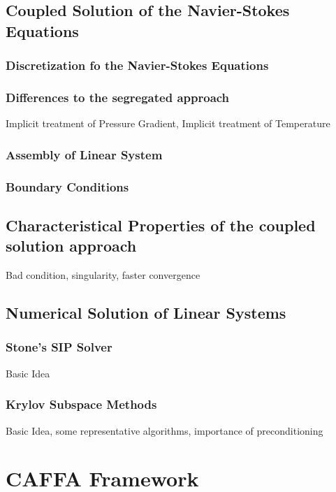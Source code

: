 \documentclass[article,type=msc,colorback,accentcolor=tud2a]{tudthesis}
\begin{document}
    \subsection{Coupled Solution of the Navier-Stokes Equations}

      \subsubsection{Discretization fo the Navier-Stokes Equations}
      \subsubsection{Differences to the segregated approach}

        Implicit treatment of Pressure Gradient, Implicit treatment of Temperature

      \subsubsection{Assembly of Linear System}

      \subsubsection{Boundary Conditions}

      \subsection{Characteristical Properties of the coupled solution approach}

      Bad condition, singularity, faster convergence

      \subsection{Numerical Solution of Linear Systems}

        \subsubsection{Stone's SIP Solver}
        Basic Idea
        \subsubsection{Krylov Subspace Methods}
        Basic Idea, some representative algorithms, importance of preconditioning

  \section{CAFFA Framework}
\end{document}
